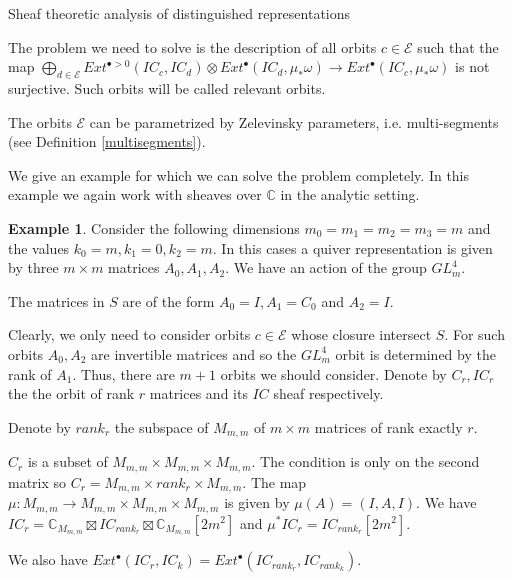 \documentclass[12pt]{article}
\newcommand{\C}{\mathbb{C}}
\newcommand{\<}{\langle}
\renewcommand{\>}{\rangle}
\theoremstyle{plain}
\theoremstyle{definition}
\newtheorem{exmp}[theorem]{Example}
\begin{document}
\begin{section}{Sheaf theoretic analysis of distinguished representations}
\begin{subsection}
The problem we need to solve is the description of all orbits $c\in \mathcal{E}$ such that the map $\bigoplus_{d\in\mathcal{E}}Ext^{\bullet>0}(IC_c,IC_d)\otimes Ext^\bullet(IC_d,\mu_*\omega)\rightarrow Ext^\bullet(IC_c,\mu_*\omega)$ is not surjective. Such orbits will be called relevant orbits.

The orbits $\mathcal{E}$ can be parametrized by Zelevinsky parameters, i.e. multi-segments (see Definition \ref{multisegments}). 









We give an example for which we can solve the problem completely. In this example we again work with sheaves over $\C$ in the analytic setting.

\begin{exmp}
Consider the following dimensions $m_0=m_1=m_2=m_3=m$ and the values  $k_0=m,k_1=0,k_2=m$. In this cases a quiver representation is given by three $m\times m$ matrices $A_0,A_1,A_2$. We have an action of the group $GL_m^4$.

The matrices in $S$ are of the form $A_0=I,A_1=C_0$ and $A_2=I$. 

Clearly, we only need to consider orbits $c\in\mathcal{E}$ whose closure intersect $S$. For such orbits $A_0,A_2$ are invertible matrices and so the $GL_m^4$ orbit is determined by the rank of $A_1$. Thus, there are $m+1$ orbits we should consider. Denote by $C_r, IC_r$ the the orbit of rank $r$ matrices and its $IC$ sheaf respectively. 

Denote by $rank_r$ the subspace of $M_{m,m}$ of $m\times m$ matrices of rank exactly $r$.

$C_r$ is a subset of $M_{m,m}\times M_{m,m}\times M_{m,m}$. The condition is only on the second matrix so $C_r=M_{m,m}\times rank_{r}\times M_{m,m}$. The map $\mu:M_{m,m}\rightarrow M_{m,m}\times M_{m,m}\times M_{m,m}$ is given by $\mu(A)=(I,A,I)$. We have $IC_r=\C_{M_{m,m}}\boxtimes IC_{rank_r}\boxtimes\C_{M_{m,m}}[2m^2]$ and $\mu^*IC_r=IC_{rank_r}[2m^2]$.

We also have $Ext^\bullet(IC_r,IC_k)=Ext^\bullet(IC_{rank_r},IC_{rank_k})$.


\end{exmp}
\end{subsection}
\end{section}
\end{document}
